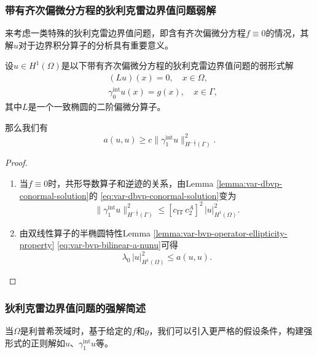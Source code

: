 \subsubsection{带有齐次偏微分方程的狄利克雷边界值问题弱解}
\label{sec:var-dbvp-f0-solution}
来考虑一类特殊的狄利克雷边界值问题，即含有齐次偏微分方程$f \equiv 0$的情况，其解$u$对于边界积分算子的分析具有重要意义。
\begin{corollary}[带有齐次偏微分方程的狄利克雷边界值问题弱解]
  \label{corollary:var-dbvp-f0-solution}
  设$u \in H^{1}(\Omega)$是以下带有齐次偏微分方程的狄利克雷边界值问题的弱形式解
  \begin{equation*}
    \begin{split}
      &\left( L u \right) (x) = 0, \quad x \in \Omega, \\
      &\gamma_0^{\text{int}} u(x) = g(x), \quad x \in \Gamma,
    \end{split}
  \end{equation*}
  其中$L$是一个一致椭圆的二阶偏微分算子。

  那么我们有
  \begin{equation}
    \label{eq:var-dbvp-f0-solution}
    a(u,u) \ge c \big\| \gamma_{1}^{\text{int}} u \big\|_{H^{-\frac{1}{2}}(\Gamma)}^2.
  \end{equation}
\end{corollary}
\begin{proof}
  \begin{enumerate}
    \item 当$f \equiv 0$时，共形导数算子和逆迹的关系，由Lemma \ref{lemma:var-dbvp-conormal-solution}的  \eqref{eq:var-dbvp-conormal-solution}变为
  \begin{equation*}
    \big\| \gamma_1^{\text{int}} u \big\|_{H^{-\frac{1}{2}}(\Gamma)}^2
    \le \left[ c_{\text{IT}} \,
    c_2^A \right]^2
    \, \big| u \big|_{H^{1}(\Omega)}^2.
  \end{equation*}

\item 由双线性算子的半椭圆特性Lemma \ref{lemma:var-bvp-operator-ellipticity-property} \eqref{eq:var-bvp-bilinear-a-nunu}可得
\begin{equation*}
  \lambda_0
  \, \big| u \big|_{H^{1}(\Omega)}^2 \le a(u,u).
\end{equation*}
\end{enumerate}
\end{proof}

\subsubsection{狄利克雷边界值问题的强解简述}
\label{sec:var-bvp-strong-solution}
当$\Omega$是利普希茨域时，基于给定的$f$和$g$，我们可以引入更严格的假设条件，构建强形式的正则解如$u$、$\gamma_{1}^{\text{int}}u$等。

